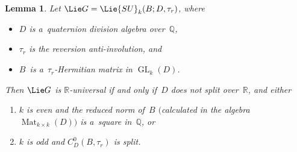 \documentclass[pdftex]{sigma}
\DeclareMathOperator{\GL}{GL}
\DeclareMathOperator{\Mat}{Mat}
\numberwithin{equation}{section}
\newtheorem{lem}[prop]{Lemma}
{\theoremstyle{definition}
\newtheorem{defn}[prop]{Definition}
\newtheorem{notation}[prop]{Notation}
\newtheorem{rem}[prop]{Remark}
\newtheorem{ques}[prop]{Question}
\newtheorem{eg}[prop]{Example}
\newtheorem{erratum}[prop]{Erratum}}
\begin{document}
\begin{lem}
\label{SO(quat)}
Let $\Lie G = \Lie{SU}_k(B; D, \tau_r)$, where
\begin{itemize}\itemsep=0pt
\item $D$ is a~quaternion division algebra over~$\mathbb{Q}$,
\item $\tau_r$ is the reversion anti-involution, and
\item $B$~is a~$\tau_r$-Hermitian matrix in $\GL_k(D)$.
\end{itemize}
Then $\Lie G$ is $\mathbb{R}$-universal if and only if~$D$ does not split over~$\mathbb{R}$, and either
\renewcommand{\labelenumi}{{\rm (\theenumi)}}
\begin{enumerate}\itemsep=0pt
\item $k$ is even and the reduced norm of~$B$ $($calculated in the algebra $\Mat_{k \times k}(D))$ is
a~square in~$\mathbb{Q}$, or
\item $k$ is odd and $C^0_D(B, \tau_r)$ is split.
\end{enumerate}
\end{lem}
\end{document}
